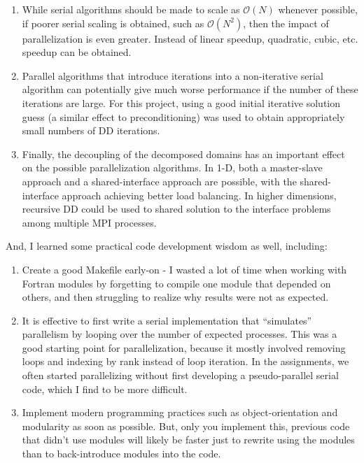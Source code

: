 \documentclass[10pt]{article}
\begin{document}
\begin{enumerate}
\item While serial algorithms should be made to scale as \(\mathscr{O}(N)\) whenever possible, if poorer serial scaling is obtained, such as \(\mathscr{O}(N^2)\), then the impact of parallelization is even greater. Instead of linear speedup, quadratic, cubic, etc. speedup can be obtained. 
\item Parallel algorithms that introduce iterations into a non-iterative serial algorithm can potentially give much worse performance if the number of these iterations are large. For this project, using a good initial iterative solution guess (a similar effect to preconditioning) was used to obtain appropriately small numbers of DD iterations.
\item Finally, the decoupling of the decomposed domains has an important effect on the possible parallelization algorithms. In 1-D, both a master-slave approach and a shared-interface approach are possible, with the shared-interface approach achieving better load balancing. In higher dimensions, recursive DD could be used to shared solution to the interface problems among multiple MPI processes.
\end{enumerate}

And, I learned some practical code development wisdom as well, including:

\begin{enumerate}
\item Create a good Makefile early-on - I wasted a lot of time when working with Fortran modules by forgetting to compile one module that depended on others, and then struggling to realize why results were not as expected.
\item It is effective to first write a serial implementation that ``simulates'' parallelism by looping over the number of expected processes. This was a good starting point for parallelization, because it mostly involved removing loops and indexing by rank instead of loop iteration. In the assignments, we often started parallelizing without first developing a pseudo-parallel serial code, which I find to be more difficult.
\item Implement modern programming practices such as object-orientation and modularity as soon as possible. But, only you implement this, previous code that didn't use modules will likely be faster just to rewrite using the modules than to back-introduce modules into the code.
\end{enumerate}
\end{document}
